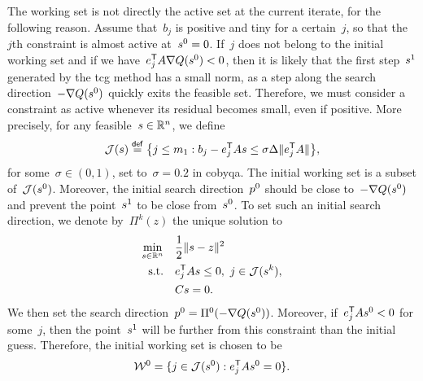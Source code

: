 The working set is not directly the active set at the current iterate, for the following reason.
Assume that~$b_j$ is positive and tiny for a certain~$j$, so that the~$j$th constraint is almost active at~$\sstep[0] = 0$.
If~$j$ does not belong to the initial working set and if we have~$e_j^{\T} A \nabla Q(\sstep[0]) < 0$, then it is likely that the first step~$\sstep[1]$ generated by the \gls{tcg} method has a small norm, as a step along the search direction~$-\nabla Q(\sstep[0])$ quickly exits the feasible set.
Therefore, we must consider a constraint as active whenever its residual becomes small, even if positive.
More precisely, for any feasible~$\sstep \in \R^n$, we define
\begin{equation*}
    \mathcal{J}(\sstep) \eqdef \set[\big]{j \le m_1 : b_j - e_j^{\T} A \sstep \le \sigma \rad \norm{e_j^{\T} A}},
\end{equation*}
for some~$\sigma \in (0, 1)$, set to~$\sigma = 0.2$ in \gls{cobyqa}.
The initial working set is a subset of~$\mathcal{J}(\sstep[0])$.
Moreover, the initial search direction~$\pstep[0]$ should be close to~$-\nabla Q(\sstep[0])$ and prevent the point~$\sstep[1]$ to be close from~$\sstep[0]$.
To set such an initial search direction, we denote by~$\Pi^k(z)$ the unique solution to
\begin{subequations}
    \label{eq:tcg-linear-working-set}
    \begin{align}
        \min_{\sstep \in \R^n}  & \quad \frac{1}{2} \norm{\sstep - z}^2\\
        \text{s.t.}             & \quad e_j^{\T} A \sstep \le 0, ~ j \in \mathcal{J}(\sstep[k]),\\
                                & \quad C \sstep = 0.
    \end{align}
\end{subequations}
We then set the search direction~$\pstep[0] = \Pi^0(-\nabla Q(\sstep[0]))$.
Moreover, if~$e_j^{\T} A \sstep[0] < 0$ for some~$j$, then the point~$\sstep[1]$ will be further from this constraint than the initial guess.
Therefore, the initial working set is chosen to be
\begin{equation*}
    \mathcal{W}^0 = \set{j \in \mathcal{J}(\sstep[0]) : e_j^{\T} A \sstep[0] = 0}.
\end{equation*}

